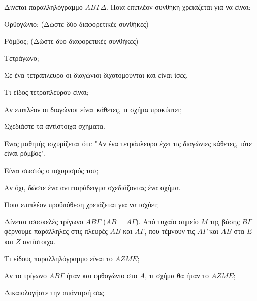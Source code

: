 \documentclass[11pt,a4paper,modern]{FFExercises}
\begin{document}
\askhsh
Δίνεται παραλληλόγραμμο $ΑΒ\varGamma\Delta$. Ποια επιπλέον συνθήκη χρειάζεται για να είναι:
\begin{alist}
    \item Ορθογώνιο; (Δώστε δύο διαφορετικές συνθήκες)
    \item Ρόμβος; (Δώστε δύο διαφορετικές συνθήκες)
    \item Τετράγωνο;
\end{alist}

\askhsh
Σε ένα τετράπλευρο οι διαγώνιοι διχοτομούνται και είναι ίσες.
\begin{alist}
    \item Τι είδος τετραπλεύρου είναι;
    \item Αν επιπλέον οι διαγώνιοι είναι κάθετες, τι σχήμα προκύπτει;
    \item Σχεδιάστε τα αντίστοιχα σχήματα.
\end{alist}

\askhsh
Ένας μαθητής ισχυρίζεται ότι: "Αν ένα τετράπλευρο έχει τις διαγώνιες κάθετες, τότε είναι ρόμβος".
\begin{alist}
    \item Είναι σωστός ο ισχυρισμός του;
    \item Αν όχι, δώστε ένα αντιπαράδειγμα σχεδιάζοντας ένα σχήμα.
    \item Ποια επιπλέον προϋπόθεση χρειάζεται για να ισχύει;
\end{alist}

\begin{center}
\end{center}

\askhsh
Δίνεται ισοσκελές τρίγωνο $ΑΒ\varGamma$ ($ΑΒ=Α\varGamma$). Από τυχαίο σημείο $Μ$ της βάσης $Β\varGamma$ φέρνουμε παράλληλες στις πλευρές $ΑΒ$ και $Α\varGamma$, που τέμνουν τις $Α\varGamma$ και $ΑΒ$ στα $Ε$ και $Z$ αντίστοιχα.
\begin{alist}
    \item Τι είδους παραλληλόγραμμο είναι το $ΑΖΜΕ$;
    \item Αν το τρίγωνο $ΑΒ\varGamma$ ήταν και ορθογώνιο στο $Α$, τι σχήμα θα ήταν το $ΑΖΜΕ$;
    \item Δικαιολογήστε την απάντησή σας.
\end{alist}
\end{document}
